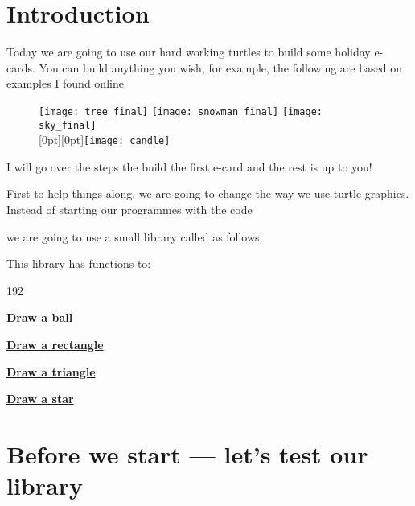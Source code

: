 \documentclass{coderdojo}
\newcommand\contentsitem[2]{
	\item \hyperref[#1]{\color{section}\bfseries #2}
}
\begin{document}
\maketitle

\section*{Introduction}

Today we are going to use our hard working turtles to build some holiday e-cards. You can build anything you wish, for example, the following are based on examples I found online

\begin{figure}[H]
\texttt{[image: tree\_final]}
\texttt{[image: snowman\_final]}
\texttt{[image: sky\_final]}\\
\mbox{}\hfill\raisebox{0pt}[0pt][0pt]{\texttt{[image: candle]}}
\end{figure}

\vspace{-12pt}
I will go over the steps the build the first e-card and the rest is up to you!

First to help things along, we are going to change the way we use turtle graphics. Instead of starting our programmes with the code


we are going to use a small library called  as follows


This library has functions to:

\begin{dingautolist}{192} 
\contentsitem{ball}{Draw a ball}\\
\contentsitem{rectangle}{Draw a rectangle}\\
\contentsitem{triangle}{Draw a triangle}\\
\contentsitem{star}{Draw a star}\\

\end{dingautolist}


\clearpage

\section{Before we start --- let's test our library}
\end{document}

